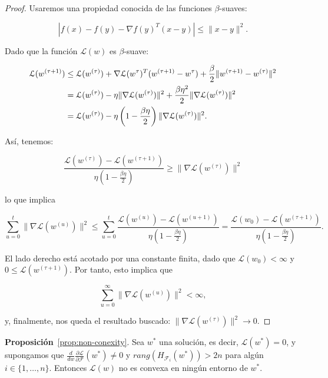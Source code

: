 \begin{proof}
  Usaremos una propiedad conocida de las funciones $\beta$-suaves:

  \[
      | f(x) - f(y) - \nabla f(y)^{T} (x-y) | \leq \| x - y \|^2.
  \]  

  Dado que la función $\mathcal{L}(w)$ es $\beta$-suave:

  \begin{align}
      \mathcal{L} (w^{(\tau + 1)}) &\leq \mathcal{L} (w^{(\tau)}) + \nabla \mathcal{L} (w^{\tau})^{T} (w^{(\tau + 1)} - w^{\tau}) + \frac{\beta}{2} \|w^{(\tau + 1)} - w^{(\tau)}\|^2 \notag \\
      &= \mathcal{L} (w^{(\tau)}) - \eta \|\nabla \mathcal{L} (w^{(\tau)})\|^2 + \frac{\beta \eta^2}{2} \|\nabla \mathcal{L} (w^{(\tau)})\|^2 \notag \\
      &= \mathcal{L} (w^{(\tau)}) - \eta \left( 1 - \frac{\beta \eta}{2} \right) \|\nabla \mathcal{L} (w^{(\tau)})\|^2.
  \end{align}

  Así, tenemos:

  \[
      \frac{\mathcal{L} (w^{(\tau)}) - \mathcal{L} (w^{(\tau + 1)})}{\eta \left( 1 - \frac{\beta \eta}{2} \right)} \geq \|\nabla \mathcal{L} (w^{(\tau)})\|^2
  \]

  lo que implica

  \[
      \sum_{u=0}^{t} \|\nabla \mathcal{L} (w^{(u)})\|^2 \leq \sum_{u=0}^{t} \frac{\mathcal{L} (w^{(u)}) - \mathcal{L} (w^{(u+1)})}{\eta \left( 1 - \frac{\beta \eta}{2} \right)} = \frac{\mathcal{L} (w_0) - \mathcal{L} (w^{(\tau + 1)})}{\eta \left( 1 - \frac{\beta \eta}{2} \right)}.
  \]

  El lado derecho está acotado por una constante finita, dado que $\mathcal{L} (w_0) < \infty$ y $0 \leq \mathcal{L} (w^{(\tau + 1)})$. Por tanto, esto implica que

  \[
      \sum_{u=0}^{\infty} \|\nabla \mathcal{L} (w^{(u)})\|^2 < \infty,
  \]

  y, finalmente, nos queda el resultado buscado: $\|\nabla \mathcal{L} (w^{(\tau)})\|^2 \to 0$.
\end{proof}

\textbf{Proposición}~\ref{prop:non-conexity}. Sea $w^{*}$ una solución, es decir, $\mathcal{L}(w^{*}) = 0$, y supongamos que $\frac{d}{dw}\frac{\partial \mathcal{L}}{\partial \mathcal{F}}(w^{*}) \neq 0$ y $rang(H_{\mathcal{F}_{i}}(w^{*})) > 2n$ para algún $i \in \{1, \ldots, n \}$. Entonces $\mathcal{L}(w)$ no es convexa en ningún entorno de $w^{*}$.

